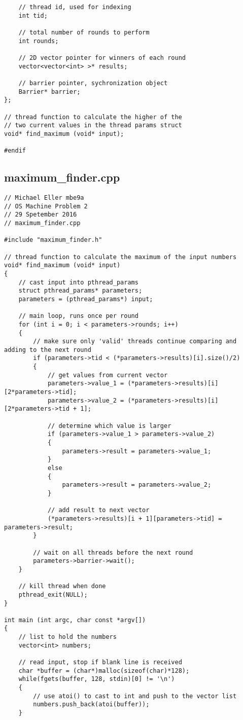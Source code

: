\documentclass[12pt,letter,titlepage]{article}
\begin{document}
{{{{\begin{verbatim}
	// thread id, used for indexing
	int tid;

	// total number of rounds to perform
	int rounds;

	// 2D vector pointer for winners of each round
	vector<vector<int> >* results;

	// barrier pointer, sychronization object
	Barrier* barrier;
};

// thread function to calculate the higher of the 
// two current values in the thread params struct
void* find_maximum (void* input);

#endif
\end{verbatim}
}
}
\pagebreak
\subsection*{maximum\_finder.cpp}{
\scriptsize{
\begin{verbatim}
// Michael Eller mbe9a
// OS Machine Problem 2
// 29 Spetember 2016
// maximum_finder.cpp

#include "maximum_finder.h"

// thread function to calculate the maximum of the input numbers
void* find_maximum (void* input)
{	
	// cast input into pthread_params
	struct pthread_params* parameters;
	parameters = (pthread_params*) input;

	// main loop, runs once per round
	for (int i = 0; i < parameters->rounds; i++)
	{
		// make sure only 'valid' threads continue comparing and adding to the next round
		if (parameters->tid < (*parameters->results)[i].size()/2)
		{
			// get values from current vector
			parameters->value_1 = (*parameters->results)[i][2*parameters->tid];
			parameters->value_2 = (*parameters->results)[i][2*parameters->tid + 1];

			// determine which value is larger
			if (parameters->value_1 > parameters->value_2)
			{
				parameters->result = parameters->value_1;
			}
			else
			{
				parameters->result = parameters->value_2;
			}

			// add result to next vector
			(*parameters->results)[i + 1][parameters->tid] = parameters->result;
		}
		
		// wait on all threads before the next round
		parameters->barrier->wait();
	}

	// kill thread when done
	pthread_exit(NULL);
}

int main (int argc, char const *argv[])
{
	// list to hold the numbers
	vector<int> numbers;

	// read input, stop if blank line is received
	char *buffer = (char*)malloc(sizeof(char)*128);
	while(fgets(buffer, 128, stdin)[0] != '\n')
	{	
		// use atoi() to cast to int and push to the vector list
		numbers.push_back(atoi(buffer));
	}


\end{verbatim}}}}}
\end{document}
